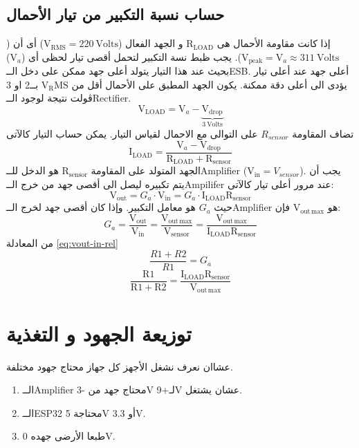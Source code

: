 \documentclass{article}
\begin{document}
\subsection{حساب نسبة التكبير من تيار الأحمال}
إذا كانت مقاومة الأحمال هى $\mathrm{R_{LOAD}}$ و الجهد الفعال (${\mathrm{V_{RMS}} = 220 \mathrm{\ Volts}}$) أى أن 
($ \mathrm{V_{peak}} = \mathrm{V}_a \approx 311 \mathrm{\ Volts} $). يجب ظبط نسة التكبير لتحمل أقصى تيار لحظى أى ($\mathrm{V}_a$) بحيث عند هذا التيار 
يتولد أعلى جهد ممكن على دخل الــ\textenglish{ESB}. أعلى جهد عند أعلى تيار يؤدى الى أعلى دقة ممكنة.
يكون الجهد المطبق على الأحمال أقل من ${\mathrm{V_RMS}}$ بــ2 او 3 ڤولت نتيجة لوجود الــ\textenglish{Rectifier}.
\[\mathrm{V_{LOAD}} = \mathrm{V}_a - \mathrm{\underbrace{V_{drop}}_{3\ Volts}}\]
تضاف المقاومة $R_{sensor}$ على التوالى مع الاحمال لقياس التيار. يمكن حساب التيار كالآتى
\[\mathrm{I_{LOAD}} = \frac{\mathrm{V}_a-\mathrm{V_{drop}}}{\mathrm{R_{LOAD}+R_{sensor}}}\]
الجهد المتولد على المقاومة $\mathrm{R_{sensor}}$ هو الدخل للــ\textenglish{Amplifier} ($\mathrm{V_{in}} = V_{sensor}$).
يجب أن يتم تكبيره ليصل الى أقصى جهد من خرج الــ\textenglish{Ampilifer} عند مرور أعلى تيار كالآتى:
\[\mathrm{V_{out}} = G_a \cdot \mathrm{V_{in}} = G_a \cdot \mathrm{I_{LOAD}R_{sensor}} \]
حيث $G_a$ هو معامل التكبير. وإذا كان أقصى جهد لخرج الــ\textenglish{Amplifier} هو $\mathrm{V_{out\,max}}$ فإن:
\[G_a = \frac{\mathrm{V_{out}}}{\mathrm{V_{in}}} = \frac{\mathrm{V_{out\,max}}}{\mathrm{V_{sensor}}} %
      = \frac{\mathrm{V_{out\,max}}}{\mathrm{I_{LOAD}R_{sensor}}} \]  
من المعادلة \ref{eq:vout-in-rel}
\[\frac{R1+R2}{R1} = G_a\]
\begin{equation}
    \mathrm{ \frac{R1}{R1+R2} = \frac{\mathrm{I_{LOAD}R_{sensor}}}{\mathrm{V_{out\,max}}}}
\end{equation}


\section{توزيعة الجهود و التغذية}

عشاان نعرف نشغل الأجهز كل جهاز محتاج جهود مختلفة.
\begin{enumerate}
    \item الــ\textenglish{Amplifier} محتاج جهد من \textenglish{-3V} لـ\textenglish{+9V} عشان يشتغل.
    \item الــ\textenglish{ESP32} محتاجة \textenglish{5V} أو \textenglish{3.3V}.
    \item طبعا الأرضى جهده \textenglish{0V}.
\end{enumerate}
\end{document}
